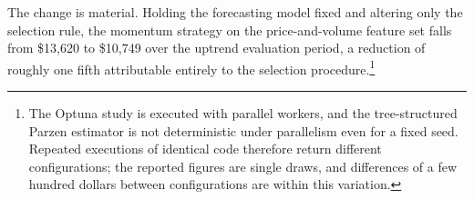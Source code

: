 The change is material. Holding the forecasting model fixed and altering only the
selection rule, the momentum strategy on the price-and-volume feature set falls
from \$13{,}620 to \$10{,}749 over the uptrend evaluation period, a reduction of
roughly one fifth attributable entirely to the selection procedure.\footnote{The
Optuna study is executed with parallel workers, and the tree-structured Parzen
estimator is not deterministic under parallelism even for a fixed seed. Repeated
executions of identical code therefore return different configurations; the
reported figures are single draws, and differences of a few hundred dollars
between configurations are within this variation.}
